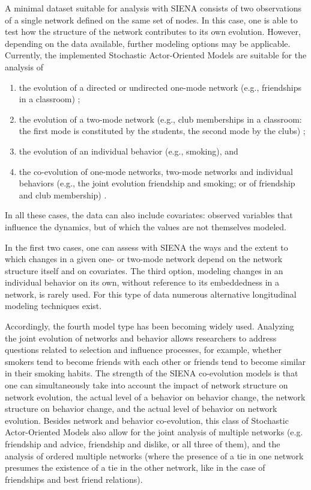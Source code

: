 \documentclass[a4paper,fleqn,11pt]{article}
\newcommand{\+}{\, + \,}
\newcommand{\SI}{{\sf SIENA }}
\newcommand{\saom}{{Stochastic Actor-Oriented Model}}
\begin{document}
A minimal dataset suitable for analysis with \SI consists of two observations of
a single network defined on the same set of nodes. In this case, one is able to
test how the structure of the network contributes to its own evolution.
However, depending on the data available, further modeling options may be
applicable. Currently, the implemented {\saom}s
are suitable for the analysis of
\begin{enumerate}
	\item	the evolution of a directed or undirected one-mode network
        (e.g., friendships in a classroom) \citep{Snijders01};
	\item	the evolution of a two-mode network
        (e.g., club memberships in a classroom: the first mode
        is constituted by the students, the second mode by the clubs)
        \citep{KoskinenEdling2012};
	\item	the evolution of an individual behavior (e.g., smoking), and
	\item	the co-evolution of one-mode networks, two-mode networks and
        individual behaviors (e.g., the joint evolution friendship and smoking;
        or of friendship and club membership) \citep{SteglichEA10, SLT2013}.
\end{enumerate}
In all these cases, the data can also include covariates: observed variables
that influence the dynamics, but of which the values are not themselves
modeled.

In the first two cases, one can assess with \SI the ways and the extent
to which changes in a given one- or two-mode network depend on the network
structure itself and on covariates. The third option, modeling changes in
an individual behavior on its own, without reference to its embeddedness
in a network, is rarely used.
For this type of data numerous alternative longitudinal modeling techniques
exist.

Accordingly, the fourth model type has been becoming widely used.
Analyzing the joint evolution of networks and behavior allows researchers
to address questions related to selection and influence processes, for
example, whether smokers tend to become friends with each other or friends
 tend to become similar in their smoking habits. The strength of the \SI
co-evolution models is that one can simultaneously take into account
the impact of network structure on network evolution, the actual level
of a behavior on behavior change, the network structure on behavior change,
and the actual level of behavior on network evolution. Besides network and
behavior co-evolution, this class of {\saom}s
also allow for the joint analysis of multiple networks (e.g. friendship
and advice, friendship and dislike, or all three of them), and the
analysis of ordered multiple networks (where the presence of a tie
in one network presumes the existence of a tie in the other network,
like in the case of friendships and best friend relations).
\end{document}
